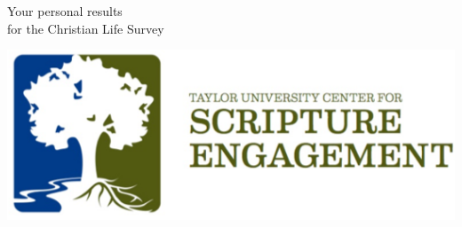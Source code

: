 \begin{multicols}{2}
  \begin{flushleft}
    \Huge
    Your personal results\\for the Christian Life Survey
  \end{flushleft}
  \columnbreak
  \includegraphics{./src/letter/templates/c4se-logo}
\end{multicols}
